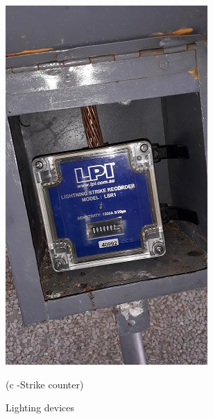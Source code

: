 \begin{figure}
\begin{minipage}[b]{0.25\linewidth}
			\includegraphics[width=\textwidth]{figures/R1P_lightning/lightningrecorder.jpg}
		\caption*{(c -Strike counter)}
	\end{minipage}
	\caption{Lighting devices}
	\label{ch04_fig_fdas_lighting}
\end{figure}